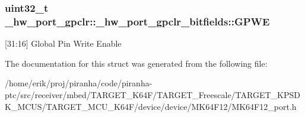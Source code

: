 \subsubsection[{\texorpdfstring{G\+P\+WE}{GPWE}}]{\setlength{\rightskip}{0pt plus 5cm}uint32\+\_\+t \+\_\+hw\+\_\+port\+\_\+gpclr\+::\+\_\+hw\+\_\+port\+\_\+gpclr\+\_\+bitfields\+::\+G\+P\+WE}\hypertarget{struct__hw__port__gpclr_1_1__hw__port__gpclr__bitfields_a3e11c185e7bd3c2fd12611fac0f86a69}{}\label{struct__hw__port__gpclr_1_1__hw__port__gpclr__bitfields_a3e11c185e7bd3c2fd12611fac0f86a69}
\mbox{[}31\+:16\mbox{]} Global Pin Write Enable 

The documentation for this struct was generated from the following file\+:\begin{DoxyCompactItemize}
\item 
/home/erik/proj/piranha/code/piranha-\/ptc/src/receiver/mbed/\+T\+A\+R\+G\+E\+T\+\_\+\+K64\+F/\+T\+A\+R\+G\+E\+T\+\_\+\+Freescale/\+T\+A\+R\+G\+E\+T\+\_\+\+K\+P\+S\+D\+K\+\_\+\+M\+C\+U\+S/\+T\+A\+R\+G\+E\+T\+\_\+\+M\+C\+U\+\_\+\+K64\+F/device/device/\+M\+K64\+F12/M\+K64\+F12\+\_\+port.\+h\end{DoxyCompactItemize}
